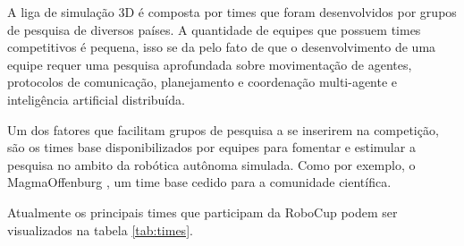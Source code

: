 A liga de simulação 3D é composta por times que foram desenvolvidos por grupos de pesquisa de diversos países. A quantidade de
equipes que possuem times competitivos é pequena, isso se da pelo fato de que o desenvolvimento de uma equipe requer uma pesquisa
aprofundada sobre movimentação de agentes, protocolos de comunicação, planejamento e coordenação multi-agente e inteligência 
artificial distribuída.

Um dos fatores que facilitam grupos de pesquisa a se inserirem na competição, são os times base disponibilizados por equipes para
fomentar e estimular a pesquisa no ambito da robótica autônoma simulada. Como por exemplo, o MagmaOffenburg \cite{magma}, um time
base cedido para a comunidade científica.

Atualmente os principais times que participam da RoboCup podem ser visualizados na tabela \ref{tab:times}.

